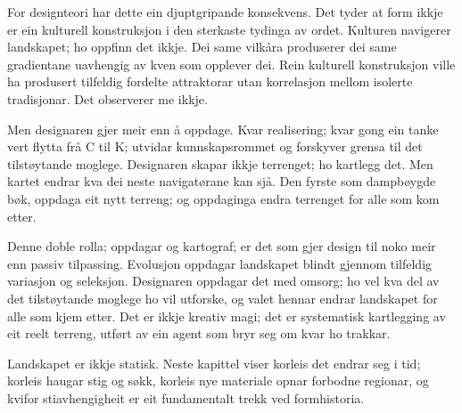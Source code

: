 For designteori har dette ein djuptgripande konsekvens. Det tyder at form ikkje er ein kulturell konstruksjon i den sterkaste tydinga av ordet. Kulturen navigerer landskapet; ho oppfinn det ikkje. Dei same vilkåra produserer dei same gradientane uavhengig av kven som opplever dei. Rein kulturell konstruksjon ville ha produsert tilfeldig fordelte attraktorar utan korrelasjon mellom isolerte tradisjonar. Det observerer me ikkje.


Men designaren gjer meir enn å oppdage. Kvar realisering; kvar gong ein tanke vert flytta frå C til K; utvidar kunnskapsrommet og forskyver grensa til det tilstøytande moglege. Designaren skapar ikkje terrenget; ho kartlegg det. Men kartet endrar kva dei neste navigatørane kan sjå. Den fyrste som dampbøygde bøk, oppdaga eit nytt terreng; og oppdaginga endra terrenget for alle som kom etter.

Denne doble rolla; oppdagar og kartograf; er det som gjer design til noko meir enn passiv tilpassing. Evolusjon oppdagar landskapet blindt gjennom tilfeldig variasjon og seleksjon. Designaren oppdagar det med omsorg; ho vel kva del av det tilstøytande moglege ho vil utforske, og valet hennar endrar landskapet for alle som kjem etter. Det er ikkje kreativ magi; det er systematisk kartlegging av eit reelt terreng, utført av ein agent som bryr seg om kvar ho trakkar.

\begin{overgang}
Landskapet er ikkje statisk. Neste kapittel viser korleis det endrar seg i tid; korleis haugar stig og søkk, korleis nye materiale opnar forbodne regionar, og kvifor stiavhengigheit er eit fundamentalt trekk ved formhistoria.
\end{overgang}

